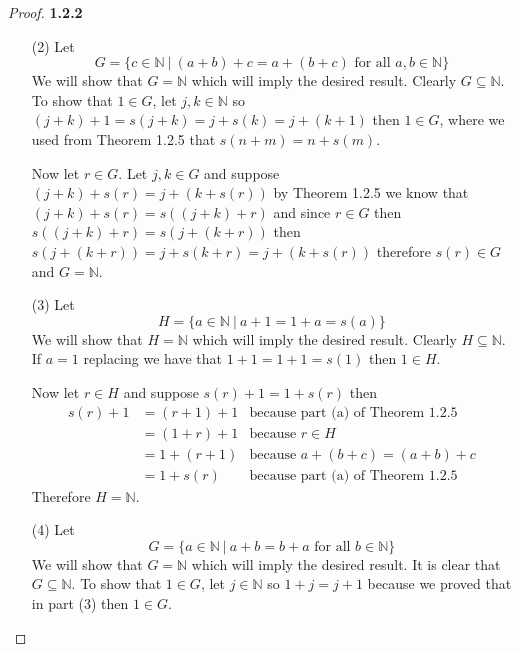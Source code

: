 \documentclass[11pt]{article}
\newcommand{\N}{\mathbb{N}}
\theoremstyle{definition}
\begin{document}
	\begin{proof}{\textbf{1.2.2}}
        \begin{itemize}
        \item [(2)] Let 
        $$G = \{c \in \N ~|~ (a+b)+c=a+(b+c) \text{ for all }a,b\in\N\}$$
        We will show that $G = \N$ which will imply the desired result. Clearly
        $G\subseteq\N$. To show that $1 \in G$, let $j, k \in \N$ so
        $(j+k)+1=s(j+k)=j+s(k)=j+(k+1)$ then $1 \in G$, where we used from
        Theorem 1.2.5 that $s(n+m) = n + s(m)$.

        Now let $r \in G$. Let $j,k \in G$ and suppose $(j+k)+s(r) = j + (k+s(r))$
        by Theorem 1.2.5 we know that $(j+k)+s(r)=s((j+k)+r)$ and since
        $r \in G$ then $s((j+k)+r)=s(j+(k+r))$ then $s(j+(k+r))=j+s(k+r)=j+(k+s(r))$
        therefore $s(r) \in G$ and $G =\N$.
        \item [(3)] Let
        $$H = \{a \in\N ~|~ a+1=1+a=s(a)\}$$
        We will show that $H = \N$ which will imply the desired result. Clearly
        $H\subseteq\N$. If $a=1$ replacing we have that $1+1=1+1=s(1)$ then
        $1\in H$.
        
        Now let $r \in H$ and suppose $s(r)+1=1+s(r)$ then
        \begin{align*}
            s(r)+1 &= (r+1)+1 &\text{because part (a) of Theorem 1.2.5}\\
                &= (1+r)+1 &\text{because } r \in H \\
                &= 1+(r+1) &\text{because } a+(b+c) = (a+b)+c \\
                &= 1+s(r) &\text{because part (a) of Theorem 1.2.5}
        \end{align*}
        Therefore $H = \N$.
        \item [(4)] Let
        $$G = \{a\in\N ~|~ a+b=b+a \text{ for all }b\in\N\}$$
        We will show that $G = \N$ which will imply the desired result. It is
        clear that $G\subseteq\N$. To show that $1 \in G$, let $j\in \N$ so
        $1+j=j+1$ because we proved that in part (3) then $1 \in G$.


\end{itemize}
\end{proof}
\end{document}
